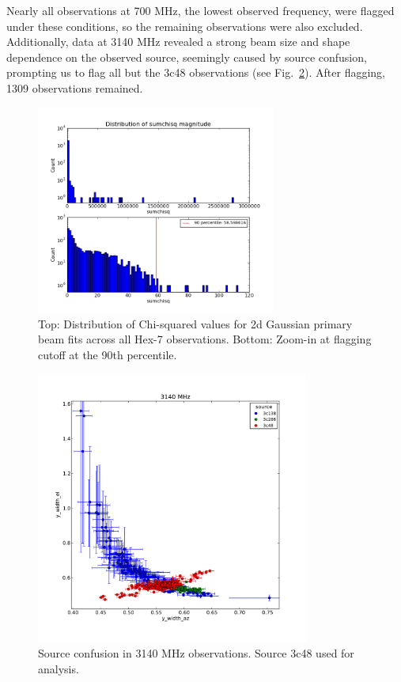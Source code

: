 \documentclass[preprint]{aastex}
\begin{document}
Nearly all observations at 700 MHz, the lowest observed frequency, were flagged under these conditions, so the remaining observations were also excluded.  Additionally, data at 3140 MHz revealed a strong beam size and shape dependence on the observed source, seemingly caused by source confusion, prompting us to flag all but the 3c48 observations (see Fig.~\ref{fig.source_confusion}).  After flagging, 1309 observations remained.

\begin{figure}[h!]
\begin{center}
\includegraphics[width=0.7\textwidth]{images/dist_sumchisq.png}
\caption{Top: Distribution of Chi-squared values for 2d Gaussian primary beam fits across all Hex-7 observations.  Bottom:  Zoom-in at flagging cutoff at the 90th percentile. \label{fig.dist_sumchisq}}
\end{center}
\end{figure}

\begin{figure}[h!]
\begin{center}
\includegraphics[width=0.8\textwidth]{images/source_confusion.pdf}
\caption{Source confusion in 3140 MHz observations.  Source 3c48 used for analysis. \label{fig.source_confusion}}
\end{center}
\end{figure}
\end{document}
